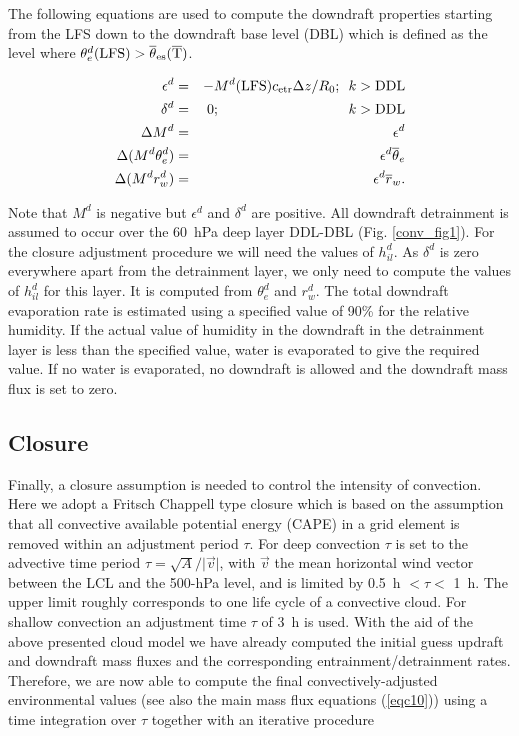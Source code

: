 The following equations are used to compute the downdraft properties
starting from the LFS down to the downdraft base level (DBL)
which is defined as the level where
$\theta_{e}^d(\rm{LFS}) >\overline{\theta}_{es}(\overline{T})$.


\begin{eqnarray}
\epsilon^d&=&-M^d({\rm LFS}) c_{\rm etr} \Delta z/R_0;\,\,\, k>{\rm DDL}\\
\delta^d&=&0; \quad\quad\quad\quad\quad\quad\quad\quad\quad\, k>{\rm DDL}\\
\Delta M^d&=&\epsilon^d\\
\Delta (M^d\theta_e^d)&=&\epsilon^d\overline{\theta}_e
\label{eqdt} \\
\Delta (M^d r_w^d)&=&\epsilon^d\overline{r}_w.
\label{eqdq}
\end{eqnarray}

\noindent
Note that $M^d$ is negative but $\epsilon^d$ and $\delta^d$ are positive.
All downdraft detrainment is assumed to occur over the 60~hPa
deep layer DDL-DBL (Fig. \ref{conv_fig1}).
For the closure adjustment procedure we will need the values of
$h_{il}^d$. As $\delta^d$ is zero everywhere apart from the
detrainment layer, we only
need to compute the values of $h_{il}^d$ for this layer. It is
computed from  $\theta_e^d$ and $r_w^d$.
The total downdraft evaporation rate is estimated using a specified
value of 90\% for the relative humidity. If the actual value
of humidity in the downdraft in the detrainment layer
is less than the specified
value, water is evaporated to give the required value. If no
water is evaporated, no downdraft is allowed and the
downdraft mass flux is set to zero.


\subsection{Closure}

Finally, a closure assumption is needed to control the intensity of
convection.  Here we adopt
a Fritsch Chappell type closure which is based on the assumption that all
convective available potential energy (CAPE) in a grid element is removed
within an adjustment period $\tau$. For deep convection $\tau$ is set
to the advective time period
$\tau=\sqrt{A}/\vert\vec v\vert$, with $\vec v$ the mean
horizontal wind vector between the LCL and the 500-hPa level, and is limited by
 0.5~h $< \tau <$ 1~h. The upper limit roughly corresponds to one life cycle
 of a convective cloud.
For shallow convection an adjustment time $\tau$ of 3~h is used.
With the aid of the above presented cloud model we have already
computed the initial guess updraft and downdraft mass fluxes
and the corresponding
entrainment/detrainment rates. Therefore, we are now able to compute
the final convectively-adjusted environmental values
(see also the main mass flux equations (\ref{eqc10}))
using a time integration over $\tau$ together with an iterative procedure


